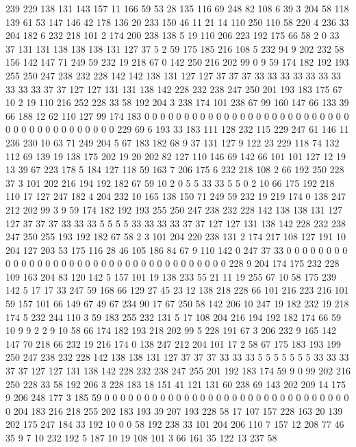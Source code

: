 239 229 138 131 143 157 11 166 59 53 28 135 116 69 248 82 108 6 39 3
204 58 118 139 61 53 147 146 42 178 136 20 233 150 46 11 21 14 110 250
110 58 220 4 236 33 204 182 6 232 218 101 2 174 200 238 138 5 19 110
206 223 192 175 66 58 2 0 33 37 131 131 138 138 138 131 127 37 5 2
59 175 185 216 108 5 232 94 9 202 232 58 156 142 147 71 249 59 232 19
218 67 0 142 250 216 202 99 0 9 59 174 182 192 193 255 250 247 238 232
228 142 142 138 131 127 127 37 37 37 33 33 33 33 33 33 33 33 33 33
37 37 127 127 131 131 138 142 228 232 238 247 250 201 193 183 175 67 10 2
19 110 216 252 228 33 58 192 204 3 238 174 101 238 67 99 160 147 66 133
39 66 188 12 62 110 127 99 174 183 0 0 0 0 0 0 0 0 0 0
0 0 0 0 0 0 0 0 0 0 0 0 0 0 0 0 0 0 0 0
0 0 0 0 0 0 0 0 0 0 229 69 6 193 33 183 111 128 232 115
229 247 61 146 11 236 230 10 63 71 249 204 5 67 183 182 68 9 37 131
127 9 122 23 229 118 74 132 112 69 139 19 138 175 202 19 20 202 82 127
110 146 69 142 66 101 101 127 12 19 13 39 67 223 178 5 184 127 118 59
163 7 206 175 6 232 218 108 2 66 192 250 228 37 3 101 202 216 194 192
182 67 59 10 2 0 5 5 33 33 5 5 0 2 10 66 175 192 218 110
17 127 247 182 4 204 232 10 165 138 150 71 249 59 232 19 219 174 0 138
247 212 202 99 3 9 59 174 182 192 193 255 250 247 238 232 228 142 138 138
131 127 127 37 37 37 33 33 33 5 5 5 5 33 33 33 33 37 37 127
127 131 138 142 228 232 238 247 250 255 193 192 182 67 58 2 3 101 204 220
238 131 2 174 217 108 127 191 10 204 127 203 53 175 116 28 46 105 186 84
67 9 110 142 0 247 37 33 0 0 0 0 0 0 0 0 0 0 0 0
0 0 0 0 0 0 0 0 0 0 0 0 0 0 0 0 0 0 0 0
0 0 0 0 228 9 204 174 175 232 228 109 163 204 83 120 142 5 157 101
19 138 233 55 21 11 19 255 67 10 58 175 239 142 5 17 17 33 247 59
168 66 129 27 45 23 12 138 218 228 66 101 216 223 216 101 59 157 101 66
149 67 49 67 234 90 17 67 250 58 142 206 10 247 19 182 232 19 218 174
5 232 244 110 3 59 183 255 232 131 5 17 108 204 216 194 192 182 174 66
59 10 9 9 2 2 9 10 58 66 174 182 193 218 202 99 5 228 191 67
3 206 232 9 165 142 147 70 218 66 232 19 216 174 0 138 247 212 204 101
17 2 58 67 175 183 193 199 250 247 238 232 228 142 138 138 131 127 37 37
37 33 33 33 5 5 5 5 5 5 5 33 33 33 37 37 127 127 131 138
142 228 232 238 247 255 201 192 183 174 59 9 0 99 202 216 250 228 33 58
192 206 3 228 183 18 151 41 121 131 60 238 69 143 202 209 14 175 9 206
248 177 3 185 59 0 0 0 0 0 0 0 0 0 0 0 0 0 0 0
0 0 0 0 0 0 0 0 0 0 0 0 0 0 0 0 0 204 183 216
218 255 202 183 193 39 207 193 228 58 17 107 157 228 163 20 139 202 175 247
184 33 192 10 0 0 58 192 238 33 101 204 206 110 7 157 12 208 77 46
35 9 7 10 232 192 5 187 10 19 108 101 3 66 161 35 122 13 237 58
